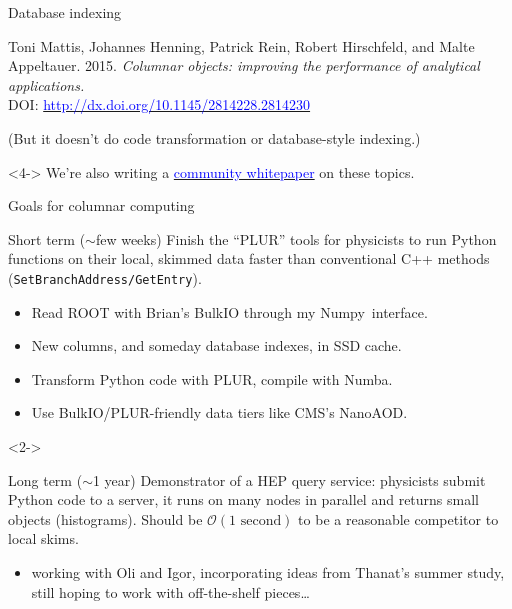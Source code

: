\documentclass{beamer}
\begin{document}
\begin{frame}{Database indexing}
\begin{uncoverenv}
\begin{minipage}{\linewidth}
\scriptsize
Toni Mattis, Johannes Henning, Patrick Rein, Robert Hirschfeld, and Malte Appeltauer. 2015. {\it Columnar objects: improving the performance of analytical applications.} \\ DOI: \href{http://dx.doi.org/10.1145/2814228.2814230}{\textcolor{blue}{http://dx.doi.org/10.1145/2814228.2814230}}
\end{minipage}

\vspace{0.1 cm}
(But it doesn't do code transformation or database-style indexing.)
\end{uncoverenv}

\begin{uncoverenv}<4->
We're also writing a \href{https://docs.google.com/document/d/1-ZrnsS3IZdH91_pb99OLGd4gxaMm3m3Vr7XBigpx8DE/edit?usp=sharing}{\textcolor{blue}{community whitepaper}} on these topics.
\end{uncoverenv}
\end{frame}

\begin{frame}{Goals for columnar computing}
\vspace{0.2 cm}
\begin{block}{Short term ($\sim$few weeks)}
Finish the ``PLUR'' tools for physicists to run Python functions on their local, skimmed data faster than conventional C++ methods ({\tt\small SetBranchAddress/GetEntry}).
\begin{itemize}
\item Read ROOT with Brian's BulkIO through my \mbox{Numpy interface.\hspace{-1 cm}}
\item New columns, and someday database indexes, in SSD cache.
\item Transform Python code with PLUR, compile with Numba.
\item Use BulkIO/PLUR-friendly data tiers like CMS's NanoAOD.
\end{itemize}
\end{block}

\vspace{-0.2 cm}
\begin{uncoverenv}<2->
\begin{block}{Long term ($\sim$1 year)}
Demonstrator of a HEP query service: physicists submit Python code to a server, it runs on many nodes in parallel and returns small objects (histograms). Should be $\mathcal{O}({\mbox{1 second}})$ to be a reasonable competitor to local skims.
\begin{itemize}
\item working with Oli and Igor, incorporating ideas from Thanat's summer study, still hoping to work with off-the-shelf pieces\ldots
\end{itemize}
\end{block}
\end{uncoverenv}
\end{frame}
\end{document}
